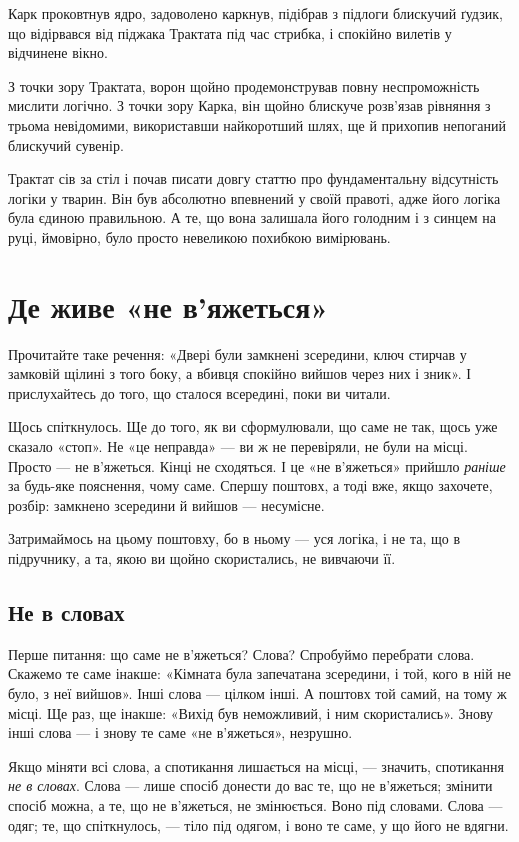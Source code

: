 \documentclass[12pt, a4paper, openany]{book}
\begin{document}
\begin{terrybox}
Карк проковтнув ядро, задоволено каркнув, підібрав з підлоги блискучий ґудзик, що відірвався від піджака Трактата під час стрибка, і спокійно вилетів у відчинене вікно.

З точки зору Трактата, ворон щойно продемонстрував повну неспроможність мислити логічно. З точки зору Карка, він щойно блискуче розв'язав рівняння з трьома невідомими, використавши найкоротший шлях, ще й прихопив непоганий блискучий сувенір.

Трактат сів за стіл і почав писати довгу статтю про фундаментальну відсутність логіки у тварин. Він був абсолютно впевнений у своїй правоті, адже його логіка була єдиною правильною. А те, що вона залишала його голодним і з синцем на руці, ймовірно, було просто невеликою похибкою вимірювань.
\end{terrybox}

\section{Де живе «не в'яжеться»}

Прочитайте таке речення: «Двері були замкнені зсередини, ключ стирчав у замковій щілині з того боку, а вбивця спокійно вийшов через них і зник». І прислухайтесь до того, що сталося всередині, поки ви читали.

Щось спіткнулось. Ще до того, як ви сформулювали, що саме не так, щось уже сказало «стоп». Не «це неправда» --- ви ж не перевіряли, не були на місці. Просто --- не в'яжеться. Кінці не сходяться. І це «не в'яжеться» прийшло \emph{раніше} за будь-яке пояснення, чому саме. Спершу поштовх, а тоді вже, якщо захочете, розбір: замкнено зсередини й вийшов --- несумісне.

Затримаймось на цьому поштовху, бо в ньому --- уся логіка, і не та, що в підручнику, а та, якою ви щойно скористались, не вивчаючи її.

\subsection{Не в словах}

Перше питання: що саме не в'яжеться? Слова? Спробуймо перебрати слова. Скажемо те саме інакше: «Кімната була запечатана зсередини, і той, кого в ній не було, з неї вийшов». Інші слова --- цілком інші. А поштовх той самий, на тому ж місці. Ще раз, ще інакше: «Вихід був неможливий, і ним скористались». Знову інші слова --- і знову те саме «не в'яжеться», незрушно.

Якщо міняти всі слова, а спотикання лишається на місці, --- значить, спотикання \emph{не в словах}. Слова --- лише спосіб донести до вас те, що не в'яжеться; змінити спосіб можна, а те, що не в'яжеться, не змінюється. Воно під словами. Слова --- одяг; те, що спіткнулось, --- тіло під одягом, і воно те саме, у що його не вдягни.
\end{document}
